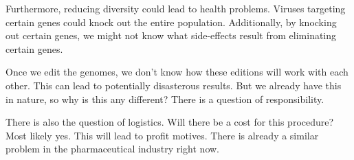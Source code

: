 \documentclass{article}
\begin{document}
Furthermore, reducing diversity could lead to health problems. Viruses targeting
certain genes could knock out the entire population. Additionally, by knocking
out certain genes, we might not know what side-effects result from eliminating
certain genes.

Once we edit the genomes, we don't know how these editions will work with each
other. This can lead to potentially disasterous results. But we already have
this in nature, so why is this any different? There is a question of
responsibility.

There is also the question of logistics. Will there be a cost for this
procedure? Most likely yes. This will lead to profit motives. There is already a
similar problem in the pharmaceutical industry right now.
\end{document}
